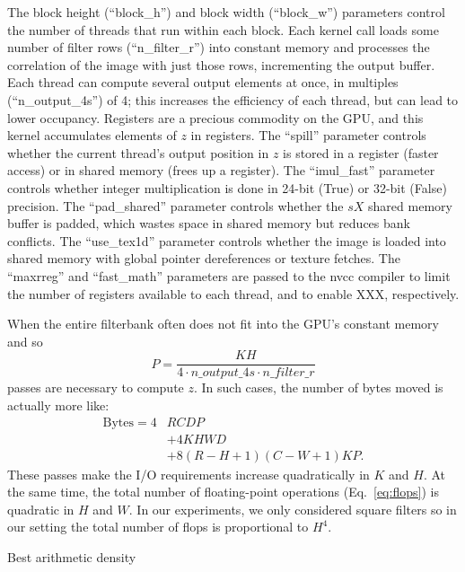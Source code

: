 \documentclass{sig-alternate}
\begin{document}
The block height (``block\_h'') and block width (``block\_w'') parameters control the
number of threads that run within each block.
Each kernel call loads some number of filter rows (``n\_filter\_r'') into
constant memory and processes the correlation of the image with just those
rows, incrementing the output buffer.
Each thread can compute several output elements
at once, in multiples (``n\_output\_4s'') of 4;
this increases the efficiency of each thread, but can lead to lower occupancy.
Registers are a precious commodity on the GPU, and this kernel accumulates
elements of $z$ in registers.
The ``spill'' parameter controls whether the current thread's output position in
$z$ is stored in a register (faster access) or in shared memory (frees up
a register).
The ``imul\_fast'' parameter controls whether integer multiplication is done
in 24-bit (True) or 32-bit (False) precision.
The ``pad\_shared'' parameter controls whether the $sX$ shared memory buffer
is padded, which wastes space in shared memory but reduces bank conflicts.
The ``use\_tex1d'' parameter controls whether the image is loaded into shared
memory with global pointer dereferences or texture fetches.
The ``maxrreg'' and ``fast\_math'' parameters are passed to the nvcc compiler to limit
the number of registers available to each thread, and to enable XXX,
respectively.



When the entire filterbank often does not fit into the GPU's
constant memory and so $$P=\frac{KH}{4 \cdot n\_output\_4s \cdot
n\_filter\_r}$$ passes are necessary to compute $z$. In such cases,
the number of bytes moved is actually more like:
\begin{align}
\mathrm{Bytes} = 4&RCDP \nonumber \\
& + 4KHWD \nonumber \\
& + 8(R-H+1)(C-W+1)KP.
\nonumber
\label{eq:bytesP}
\end{align}
These passes make the I/O requirements increase quadratically in $K$ and $H$.
At the same time, the total number of floating-point operations (Eq.~\ref{eq:flops})
is quadratic in $H$ and $W$. In our experiments, we only considered square
filters so in our setting the total number of flops is proportional to $H^4$.

Best arithmetic density
\end{document}
